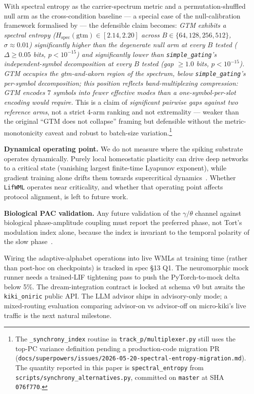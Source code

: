 \documentclass[10pt,twocolumn]{article}
\begin{document}
With spectral entropy as the carrier-spectrum metric and a
permutation-shuffled null arm as the cross-condition baseline ---
a special case of the null-calibration framework formalised by
\cite{aristotelianprh2026} --- the defensible claim becomes:
\emph{GTM exhibits a spectral entropy
($H_{\text{spec}}(\text{gtm}) \in [2.14, 2.20]$ across
$B \in \{64,128,256,512\}$, $\sigma \approx 0.01$)
significantly higher than the degenerate null arm at every $B$ tested
($\Delta \geq 0.05$ bits, $p < 10^{-15}$) and significantly lower than
\texttt{simple\_gating}'s independent-symbol decomposition at every $B$
tested (gap $\geq 1.0$ bits, $p < 10^{-15}$). GTM occupies the
gtm-and-akorn region of the spectrum, below \texttt{simple\_gating}'s
per-symbol decomposition; this position reflects band-multiplexing
compression: GTM encodes $7$ symbols into fewer effective modes than
a one-symbol-per-slot encoding would require.} This is a claim of
\emph{significant pairwise gaps against two reference arms}, not a
strict 4-arm ranking and not extremality --- weaker than the original
``GTM does not collapse'' framing but defensible without the
metric-monotonicity caveat and robust to batch-size variation.\footnote{%
The \texttt{\_synchrony\_index} routine in
\texttt{track\_p/multiplexer.py} still uses the top-PC variance
definition pending a production-code migration PR
(\texttt{docs/superpowers/issues/2026-05-20-spectral-entropy-migration.md}).
The quantity reported in this paper is \texttt{spectral\_entropy}
from \texttt{scripts/synchrony\_alternatives.py}, committed on
\texttt{master} at SHA \texttt{076f770}.}

\textbf{Dynamical operating point.} We do not measure where the spiking
substrate operates dynamically. Purely local homeostatic plasticity can
drive deep networks to a critical state (vanishing largest finite-time
Lyapunov exponent), while gradient training alone drifts them towards
supercritical dynamics~\cite{vock2026adaptivesoc}. Whether
\texttt{LifWML} operates near criticality, and whether that operating
point affects protocol alignment, is left to future work.

\textbf{Biological PAC validation.} Any future validation of the
$\gamma/\theta$ channel against biological phase-amplitude coupling must
report the preferred phase, not Tort's modulation index alone, because
the index is invariant to the temporal polarity of the slow
phase~\cite{keshavarzi2026mipolarity}.

Wiring the adaptive-alphabet operations into live WMLs at training
time (rather than post-hoc on checkpoints) is tracked in spec \S 13
Q1. The neuromorphic mock runner needs a trained-LIF tightening pass
to push the PyTorch-to-mock delta below 5\%. The dream-integration
contract is locked at schema v0 but awaits the \texttt{kiki\_oniric}
public API. The LLM advisor ships in advisory-only mode; a mixed-routing
evaluation comparing advisor-on vs advisor-off on micro-kiki's live
traffic is the next natural milestone.



\end{document}
